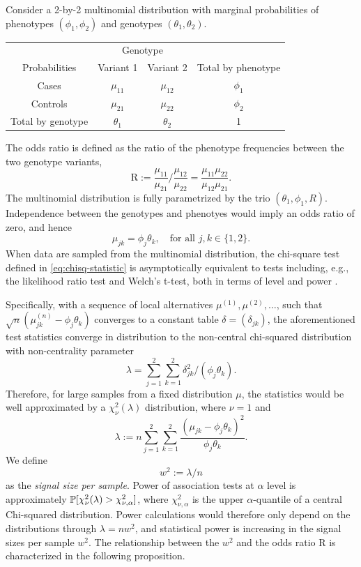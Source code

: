 Consider a 2-by-2 multinomial distribution with marginal probabilities of phenotypes $(\phi_1, \phi_2)$ and genotypes $(\theta_1, \theta_2)$.
\begin{center}
    \begin{tabular}{cccc}
    \hline
    & \multicolumn{2}{c}{Genotype} \\
    \cline{2-3}
    Probabilities & Variant 1 & Variant 2 & Total by phenotype \\
    \hline
    Cases & $\mu_{11}$ & $\mu_{12}$ & $\phi_1$ \\
    Controls & $\mu_{21}$ & $\mu_{22}$ & $\phi_2$ \\
    Total by genotype & $\theta_1$ & $\theta_2$ & 1 \\
    \hline
    \end{tabular}
\end{center}
The odds ratio is defined as the ratio of the phenotype frequencies between the two genotype variants,
\begin{equation} \label{eq:odds-ratio}
    \text{R} := \frac{\mu_{11}}{\mu_{21}}\Big/\frac{\mu_{12}}{\mu_{22}}
    = \frac{\mu_{11}\mu_{22}}{\mu_{12}\mu_{21}}.
\end{equation}
The multinomial distribution is fully parametrized by the trio $(\theta_1, \phi_1, R)$.
Independence between the genotypes and phenotyes would imply an odds ratio of zero, and hence
$$
\mu_{jk} = \phi_j\theta_k, \quad \text{for all }j,k \in\{1,2\}.
$$
When data are sampled from the multinomial distribution, the chi-square test defined in \eqref{eq:chisq-statistic} is asymptotically equivalent to tests including, e.g., the likelihood ratio test and Welch's t-test, both in terms of level and power \cite{ferguson2017course,gao2019upass}.

Specifically, with a sequence of local alternatives $\mu^{(1)}, \mu^{(2)}, \ldots$, such that $\sqrt{n}(\mu^{(n)}_{jk} - \phi_j\theta_k)$ converges to a constant table $\delta = (\delta_{jk})$, the aforementioned test statistics converge in distribution to the non-central chi-squared distribution with non-centrality parameter 
$$\lambda = \sum_{j=1}^2 \sum_{k=1}^2 {\delta_{jk}^2}/{(\phi_j\theta_k)}.$$
Therefore, for large samples from a fixed distribution $\mu$, the statistics would be well approximated by a $\chi^2_\nu(\lambda)$ distribution, where $\nu=1$ and
\begin{equation} 
    \lambda := n\sum_{j=1}^2 \sum_{k=1}^2 \frac{(\mu_{jk} - \phi_j\theta_k)^2}{\phi_j\theta_k}.
\end{equation}
We define 
\begin{equation} \label{eq:signal-size-chisq}
    w^2:=\lambda/n
\end{equation} 
as the \emph{signal size per sample}.
Power of association tests at $\alpha$ level is approximately $\P[\chi^2_{\nu}(\lambda)>\chi^2_{\nu,\alpha}]$, where $\chi^2_{\nu,\alpha}$ is the upper $\alpha$-quantile of a central Chi-squared distribution.
Power calculations would therefore only depend on the distributions through $\lambda=nw^2$, and statistical power is increasing in the signal sizes per sample $w^2$.
The relationship between the $w^2$ and the odds ratio $\text{R}$ is characterized in the following proposition.

